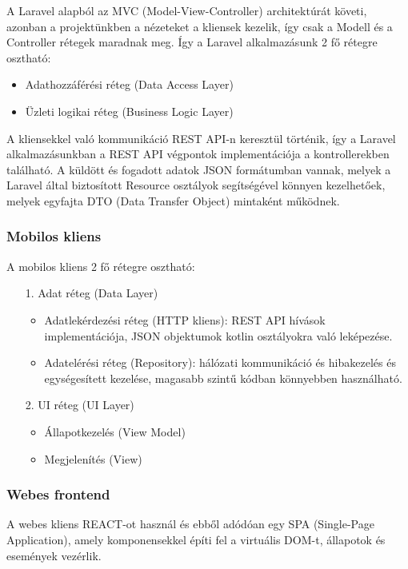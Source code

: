 A Laravel alapból az MVC (Model-View-Controller) architektúrát követi, azonban a projektünkben a nézeteket a kliensek kezelik, így csak a Modell és a Controller rétegek maradnak meg. Így a Laravel alkalmazásunk 2 fő rétegre osztható:

\begin{itemize}
    \item Adathozzáférési réteg (Data Access Layer)
    \item Üzleti logikai réteg (Business Logic Layer)
\end{itemize}

A kliensekkel való kommunikáció REST API-n keresztül történik, így a Laravel alkalmazásunkban a REST API végpontok implementációja a kontrollerekben található. A küldött és fogadott adatok JSON formátumban vannak, melyek a Laravel által biztosított Resource osztályok segítségével könnyen kezelhetőek, melyek egyfajta DTO (Data Transfer Object) mintaként működnek.

\subsubsection{Mobilos kliens}

A mobilos kliens 2 fő rétegre osztható:

\begin{itemize}
    \item  [1.] Adat réteg (Data Layer)
    \begin{itemize}
        \item Adatlekérdezési réteg (HTTP kliens): REST API hívások implementációja, JSON objektumok kotlin osztályokra való leképezése.
        \item Adatelérési réteg (Repository): hálózati kommunikáció és hibakezelés és egységesített kezelése, magasabb szintű kódban könnyebben használható.
    \end{itemize}
    \item  [2.] UI réteg (UI Layer)
    \begin{itemize}
        \item  Állapotkezelés (View Model)
        \item  Megjelenítés (View)

    \end{itemize}
\end{itemize}

\subsubsection{Webes frontend}

A webes kliens REACT-ot használ és ebből adódóan egy SPA (Single-Page Application), amely komponensekkel építi fel a virtuális DOM-t, állapotok és események vezérlik.